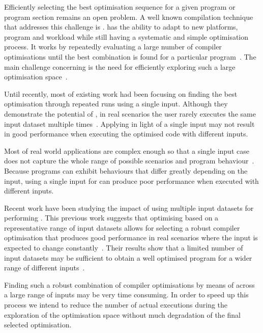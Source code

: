 Efficiently selecting the best optimisation sequence for a given program or program section remains an open problem.
A well known compilation technique that addresses this challenge is {\itercomp}.
{\Itercomp} has the ability to adapt to new platforms, program and workload while still having a systematic and simple optimisation process.
It works by repeatedly evaluating a large number of compiler optimisations until the best combination is found for a particular program~\citep{fursin07,chen10}.
The main challenge concerning {\itercomp} is the need for efficiently exploring such a large optimisation space~\citep{fursin07,cavazos07,zhou12}.

Until recently, most of existing work  had been focusing on finding the best optimisation through repeated runs using a single input.
Although they demonstrate the potential of {\itercomp}, in real scenarios the user rarely executes the same input dataset multiple times~\citep{bodin98,kisuki99,stephenson03,kulkarni04,agakov06}.
Applying {\itercomp} in light of a single input may not result in good performance when executing the optimised code with different inputs.

Most of real world applications are complex enough so that a single input case does not capture the whole range of possible scenarios and program behaviour~\citep{haneda06,fursin07,chen10,chen12a}.
Because programs can exhibit behaviours that differ greatly depending on the input,
using a single input for {\itercomp} can produce poor performance when executed with different inputs.

Recent work have been studying the impact of using multiple input datasets
for performing {\itercomp}.
This previous work suggests that optimising based on a representative range of input datasets allows for selecting a robust compiler optimisation that produces good performance in real scenarios where the input is expected to change constantly~\citep{haneda06,fursin07,chen10,chen12a,chen12b,fang15,mpeis16}.
Their results show that a limited number of input datasets may be sufficient to obtain a well optimised program for a wider range of different inputs~\citep{haneda06,fursin07,chen10,chen12a}.

Finding such a robust combination of compiler optimisations by means of {\itercomp} across a large range of inputs may be very time consuming.
In order to speed up this process we intend to reduce the number of actual executions during the exploration of the optimisation space without much degradation of the final selected optimisation.

